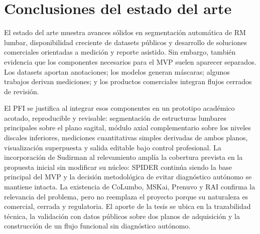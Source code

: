\section{Conclusiones del estado del arte}

El estado del arte muestra avances sólidos en segmentación automática de RM lumbar, disponibilidad creciente de datasets públicos y desarrollo de soluciones comerciales orientadas a medición y reporte asistido. Sin embargo, también evidencia que los componentes necesarios para el MVP suelen aparecer separados. Los datasets aportan anotaciones; los modelos generan máscaras; algunos trabajos derivan mediciones; y los productos comerciales integran flujos cerrados de revisión.

El PFI se justifica al integrar esos componentes en un prototipo académico acotado, reproducible y revisable: segmentación de estructuras lumbares principales sobre el plano sagital, módulo axial complementario sobre los niveles discales inferiores, mediciones cuantitativas simples derivadas de ambos planos, visualización superpuesta y salida editable bajo control profesional. La incorporación de Sudirman al relevamiento amplía la cobertura prevista en la propuesta inicial sin modificar su núcleo: SPIDER continúa siendo la base principal del MVP y la decisión metodológica de evitar diagnóstico autónomo se mantiene intacta. La existencia de CoLumbo, MSKai, Prenuvo y RAI confirma la relevancia del problema, pero no reemplaza el proyecto porque su naturaleza es comercial, cerrada y regulatoria. El aporte de la tesis se ubica en la trazabilidad técnica, la validación con datos públicos sobre dos planos de adquisición y la construcción de un flujo funcional sin diagnóstico autónomo.
